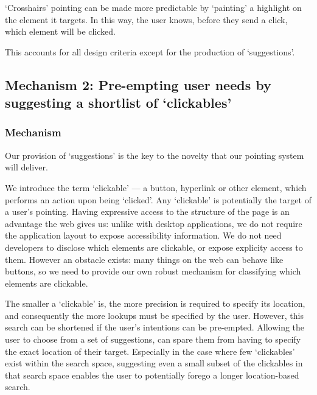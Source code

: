 \documentclass[a4paper, 12pt]{report}
\begin{document}
`Crosshairs' pointing can be made more predictable by `painting' a highlight on the element it targets. In this way, the user knows, before they send a click, which element will be clicked.

This accounts for all design criteria except for the production of `suggestions'.
\subsection{Mechanism 2: Pre-empting user needs by suggesting a shortlist of `clickables'}
\subsubsection{Mechanism}
Our provision of `suggestions' is the key to the novelty that our pointing system will deliver.

\label{sec:clickablesExplained}
We introduce the term `clickable' --- a button, hyperlink or other element, which performs an action upon being `clicked'. Any `clickable' is potentially the target of a user's pointing. Having expressive access to the structure of the page is an advantage the web gives us: unlike with desktop applications, we do not require the application layout to expose accessibility information. We do not need developers to disclose which elements are clickable, or expose explicity access to them. However an obstacle exists: many things on the web can behave like buttons, so we need to provide our own robust mechanism for classifying which elements are clickable.

The smaller a `clickable' is, the more precision is required to specify its location, and consequently the more lookups must be specified by the user. However, this search can be shortened if the user's intentions can be pre-empted. Allowing the user to choose from a set of suggestions, can spare them from having to specify the exact location of their target. Especially in the case where few `clickables' exist within the search space, suggesting even a small subset of the clickables in that search space enables the user to potentially forego a longer location-based search.
\end{document}
